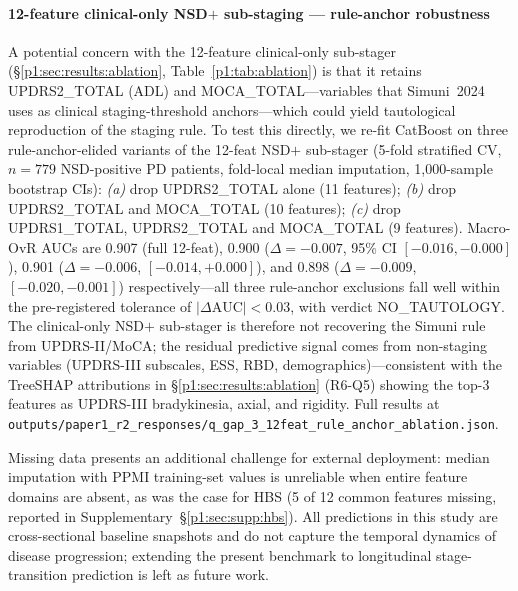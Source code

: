 \paragraph*{12-feature clinical-only NSD$+$ sub-staging --- rule-anchor robustness} A potential concern with the 12-feature clinical-only sub-stager (\S\ref{p1:sec:results:ablation}, Table~\ref{p1:tab:ablation}) is that it retains UPDRS2\_TOTAL (ADL) and MOCA\_TOTAL---variables that Simuni~2024 uses as clinical staging-threshold anchors---which could yield tautological reproduction of the staging rule. To test this directly, we re-fit CatBoost on three rule-anchor-elided variants of the 12-feat NSD$+$ sub-stager (5-fold stratified CV, $n{=}779$ NSD-positive PD patients, fold-local median imputation, 1{,}000-sample bootstrap CIs): \emph{(a)} drop UPDRS2\_TOTAL alone (11 features); \emph{(b)} drop UPDRS2\_TOTAL and MOCA\_TOTAL (10 features); \emph{(c)} drop UPDRS1\_TOTAL, UPDRS2\_TOTAL and MOCA\_TOTAL (9 features). Macro-OvR AUCs are 0.907 (full 12-feat), 0.900 ($\Delta{=}{-}0.007$, 95\% CI $[{-}0.016, {-}0.000]$), 0.901 ($\Delta{=}{-}0.006$, $[{-}0.014, {+}0.000]$), and 0.898 ($\Delta{=}{-}0.009$, $[{-}0.020, {-}0.001]$) respectively---all three rule-anchor exclusions fall well within the pre-registered tolerance of $|\Delta\mathrm{AUC}|<0.03$, with verdict NO\_TAUTOLOGY. The clinical-only NSD$+$ sub-stager is therefore not recovering the Simuni rule from UPDRS-II/MoCA; the residual predictive signal comes from non-staging variables (UPDRS-III subscales, ESS, RBD, demographics)---consistent with the TreeSHAP attributions in \S\ref{p1:sec:results:ablation} (R6-Q5) showing the top-3 features as UPDRS-III bradykinesia, axial, and rigidity. Full results at \texttt{outputs/paper1\_r2\_responses/q\_gap\_3\_12feat\_rule\_anchor\_ablation.json}.

Missing data presents an additional challenge for external deployment: median imputation with PPMI training-set values is unreliable when entire feature domains are absent, as was the case for HBS (5 of 12 common features missing, reported in Supplementary~\S\ref{p1:sec:supp:hbs}). All predictions in this study are cross-sectional baseline snapshots and do not capture the temporal dynamics of disease progression; extending the present benchmark to longitudinal stage-transition prediction is left as future work.

